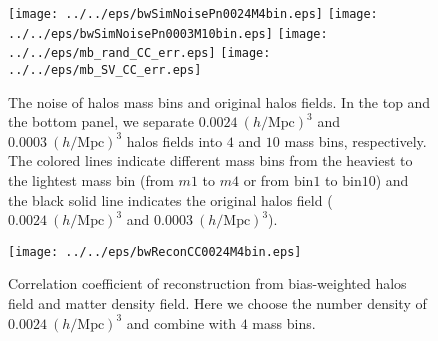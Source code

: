\begin{figure}[tbp]
\begin{center}
\texttt{[image: ../../eps/bwSimNoisePn0024M4bin.eps]}
\texttt{[image: ../../eps/bwSimNoisePn0003M10bin.eps]}
\texttt{[image: ../../eps/mb\_rand\_CC\_err.eps]}
\texttt{[image: ../../eps/mb\_SV\_CC\_err.eps]}
\end{center}
\vspace{-0.7cm}
\caption{The noise of halos mass bins and original halos fields.
In the top and the bottom panel, we separate $0.0024\ (h/\mathrm{Mpc})^3$ 
and $0.0003\ (h/\mathrm{Mpc})^3$ halos fields into $4$ and $10$ mass bins, 
respectively. The colored lines indicate different mass bins from the 
heaviest to the lightest mass bin (from $m1$ to $m4$ or from $\mathrm{bin1}$
 to $\mathrm{bin10}$) and the black solid line 
 indicates the original halos field 
($0.0024\ (h/\mathrm{Mpc})^3$ and $0.0003\ (h/\mathrm{Mpc})^3$).}
\label{fig:bw_Pnoise}
\end{figure}
\begin{figure}[tbp]
\begin{center}
\texttt{[image: ../../eps/bwReconCC0024M4bin.eps]}
\end{center}
\vspace{-0.7cm}
\caption{Correlation coefficient of reconstruction from bias-weighted halos 
field and matter density field. Here we choose the number density of 
$0.0024\ (h/\mathrm{Mpc})^3$ and combine with $4$ mass bins.}
\label{fig:bw_recon_CC}
\end{figure}